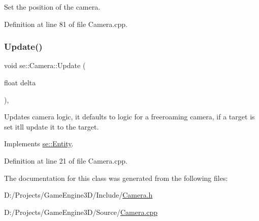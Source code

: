 Set the position of the camera. 

Definition at line 81 of file Camera.\+cpp.

\mbox{\label{classse_1_1_camera_abecf2d50dc793707a475b35bb487812c}} 
\subsubsection{\texorpdfstring{Update()}{Update()}}
{\footnotesize\ttfamily void se\+::\+Camera\+::\+Update (\begin{DoxyParamCaption}\item[{float}]{delta }\end{DoxyParamCaption})\hspace{0.3cm}{\ttfamily [override]}, {\ttfamily [virtual]}}

Updates camera logic, it defaults to logic for a freeroaming camera, if a target is set it\textquotesingle{}ll update it to the target. 

Implements \mbox{\hyperlink{classse_1_1_entity_a1542c96865f6646c7b0cb0d9be7f88ad}{se\+::\+Entity}}.



Definition at line 21 of file Camera.\+cpp.



The documentation for this class was generated from the following files\+:\begin{DoxyCompactItemize}
\item 
D\+:/\+Projects/\+Game\+Engine3\+D/\+Include/\mbox{\hyperlink{_camera_8h}{Camera.\+h}}\item 
D\+:/\+Projects/\+Game\+Engine3\+D/\+Source/\mbox{\hyperlink{_camera_8cpp}{Camera.\+cpp}}\end{DoxyCompactItemize}
